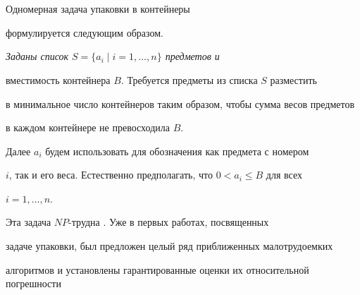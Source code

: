 \date{} 




 


\pagestyle{plain} %


 


 




 


\maketitle 


 




 


\section{\ }





Одномерная задача упаковки в контейнеры \cite{CGJ}


формулируется следующим образом.


{\em Заданы список $S=\{ a_{i}\mid i=1,\dotsc ,n\}$ предметов и


вместимость контейнера $B$. Требуется предметы из списка $S$ разместить


в минимальное число контейнеров таким образом, чтобы сумма весов предметов


в каждом контейнере не превосходила $B$.}





Далее $a_{i}$ будем использовать для обозначения как предмета с номером


$i$, так и его веса. Естественно предполагать, что $0<a_i\le B$ для всех


$i=1,\dotsc,n.$


Эта задача $NP$-трудна \cite {JDUGG}. Уже в первых работах, посвященных


задаче упаковки, был предложен целый ряд приближенных малотрудоемких


алгоритмов и установлены гарантированные оценки их относительной погрешности


